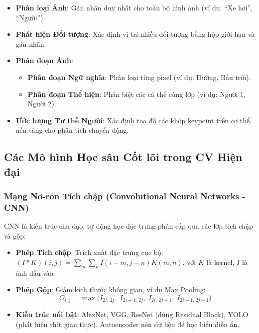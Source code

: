 \begin{itemize}
    \item \textbf{Phân loại Ảnh}: Gán nhãn duy nhất cho toàn bộ hình ảnh (ví dụ: ``Xe hơi'', ``Người'').\autocite{krizhevsky2012}
    \item \textbf{Phát hiện Đối tượng}: Xác định vị trí nhiều đối tượng bằng hộp giới hạn và gán nhãn.\autocite{redmon2016}
    \item \textbf{Phân đoạn Ảnh}:
    \begin{itemize}
        \item \textbf{Phân đoạn Ngữ nghĩa}: Phân loại từng pixel (ví dụ: Đường, Bầu trời).\autocite{ronneberger2015}
        \item \textbf{Phân đoạn Thể hiện}: Phân biệt các cá thể cùng lớp (ví dụ: Người 1, Người 2).\autocite{ronneberger2015}
    \end{itemize}
    \item \textbf{Ước lượng Tư thế Người}: Xác định tọa độ các khớp keypoint trên cơ thể, nền tảng cho phân tích chuyển động.\autocite{lin2014}
\end{itemize}

\subsection{Các Mô hình Học sâu Cốt lõi trong CV Hiện đại}
\subsubsection{Mạng Nơ-ron Tích chập (Convolutional Neural Networks - CNN)}
CNN là kiến trúc chủ đạo, tự động học đặc trưng phân cấp qua các lớp tích chập và gộp:

\begin{itemize}
    \item \textbf{Phép Tích chập}: Trích xuất đặc trưng cục bộ: $(I * K)(i, j) = \sum_{m} \sum_{n} I(i-m, j-n) K(m, n)$, với $K$ là kernel, $I$ là ảnh đầu vào.\autocite{lecun1998}
    \item \textbf{Phép Gộp}: Giảm kích thước không gian, ví dụ Max Pooling:
\[
O_{i,j} = \max \bigl( I_{2i,\,2j},\; I_{2i+1,\,2j},\; I_{2i,\,2j+1},\; I_{2i+1,\,2j+1} \bigr)
\]
\autocite{lecun1998}
    \item \textbf{Kiến trúc nổi bật}: AlexNet, VGG, ResNet (dùng Residual Block), YOLO (phát hiện thời gian thực).\autocite{krizhevsky2012,simonyan2014,he2016,redmon2016} Autoencoder nén dữ liệu để học biểu diễn ẩn.\autocite{szeliski2010}
\end{itemize}

